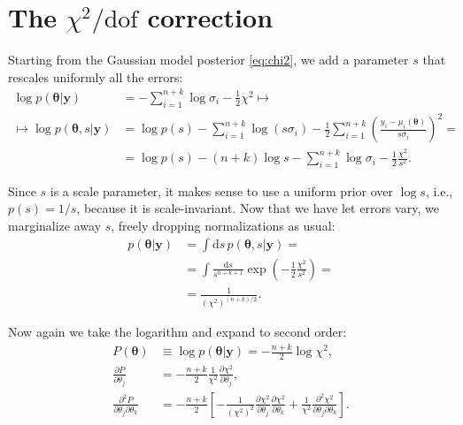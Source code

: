 \section{The $\chi^2/\mathrm{dof}$ correction}

Starting from the Gaussian model posterior \eqref{eq:chi2}, we add a parameter
$s$ that rescales uniformly all the errors:
%
\begin{align}
    \log p(\boldsymbol\theta|\mathbf y)
    &= -\sum_{i=1}^{n+k} \log\sigma_i - \frac12 \chi^2 \mapsto \\
    \mapsto \log p(\boldsymbol\theta,s|\mathbf y)
    &= \log p(s) -\sum_{i=1}^{n+k} \log(s \sigma_i)
    - \frac 12 \sum_{i=1}^{n+k}
    \left( \frac {y_i - \mu_i(\boldsymbol\theta)} {s \sigma_i} \right)^2 = \\
    &= \log p(s) - (n+k) \log s - \sum_{i=1}^{n+k} \log\sigma_i
    - \frac 12 \frac{\chi^2}{s^2}.
\end{align}

Since $s$ is a scale parameter, it makes sense to use a uniform prior over
$\log s$, i.e., $p(s) = 1/s$, because it is scale-invariant. Now that we have
let errors vary, we marginalize away $s$, freely dropping normalizations as
usual:
%
\begin{align}
    p(\boldsymbol\theta|\mathbf y)
    &= \int \mathrm ds\,
    p(\boldsymbol\theta,s|\mathbf y) = \\
    &= \int \frac {\mathrm ds} {s^{n+k+1}}
    \exp\left(-\frac12 \frac {\chi^2} {s^2}\right) = \\
    &= \frac 1 {(\chi^2)^{(n+k)/2}}.
\end{align}

Now again we take the logarithm and expand to second order:
%
\begin{align}
    P(\boldsymbol\theta) &\equiv
    \log p(\boldsymbol\theta|\mathbf y)
    = -\frac{n+k}2 \log \chi^2, \\
    \frac {\partial P} {\partial \theta_j}
    &= -\frac{n+k}2 \frac 1{\chi^2}
    \frac {\partial \chi^2} {\partial \theta_j}, \\
    \frac {\partial^2 P} {\partial\theta_j \partial\theta_k}
    &= -\frac{n+k}2 \left[
    -\frac 1 {(\chi^2)^2}
    \frac {\partial \chi^2} {\partial \theta_j}
    \frac {\partial \chi^2} {\partial \theta_k}
    + \frac 1{\chi^2}
    \frac {\partial^2 \chi^2} {\partial\theta_j \partial\theta_k}
    \right]. \label{eq:Pjk}
\end{align}

